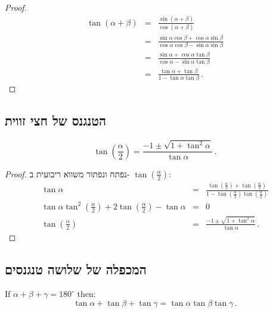 \begin{proof}

\begin{eqnarray*}
\tan (\alpha+\beta) &=& \frac{\sin(\alpha+\beta)}{\cos(\alpha+\beta)}\\
&=&\frac{\sin\alpha\cos\beta+\cos\alpha\sin\beta}{\cos\alpha\cos\beta-\sin\alpha\sin\beta}\\
&=&\frac{\sin\alpha+\cos\alpha\tan\beta}{\cos\alpha-\sin\alpha\tan\beta}\\
&=&\frac{\tan\alpha+\tan\beta}{1-\tan\alpha\tan\beta}\,.
\end{eqnarray*}

\end{proof}


\subsection{הטנגנס של חצי זווית}\label{s.tangent-half}
\begin{theorem}\label{thm.tangent-half}
\[
\tan\left(\frac{\alpha}{2}\right) = \frac{-1\pm\sqrt{1+\tan^2\alpha}}{\tan\alpha}\,.
\]
\end{theorem}
\begin{proof}
נפתח ונפתור משווא ריבועית ב-%
$\tan(\frac{\alpha}{2})$:
\begin{displaymath}
\begin{array}{lll}
\tan \alpha&=&\displaystyle\frac{
  \tan\left(\displaystyle\frac{\alpha}{2}\right)+
  \tan\left(\displaystyle\frac{\alpha}{2}\right)
  }{
  1-\tan\left(\displaystyle\frac{\alpha}{2}\right)
    \tan\left(\displaystyle\frac{\alpha}{2}\right)
  }\\
\tan\alpha \tan^2  \left(\displaystyle\frac{\alpha}{2}\right) + 2 \tan \left(\displaystyle\frac{\alpha}{2}\right) -\tan\alpha &=&0\\
\tan\left(\displaystyle\frac{\alpha}{2}\right) &=& \displaystyle\frac{-1\pm\sqrt{1+\tan^2\alpha}}{\tan\alpha}\,.
\end{array}
\end{displaymath}
\end{proof}



\subsection{המכפלה של שלושה טנגנסים}\label{s.tangent-three}
\begin{theorem}\label{thm.tangent3}
If $\alpha+\beta+\gamma=180^\circ$ then:
\[
\tan\alpha+\tan\beta+\tan\gamma = \tan\alpha\tan\beta\tan\gamma\,.
\]
\end{theorem}

